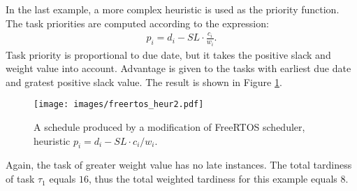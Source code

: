 In the last example, a more complex heuristic is used as the priority function.
The task priorities are computed according to the expression:
\begin{align*}
p_i = d_i - SL \cdot \frac{c_i}{w_i}.
\end{align*}
Task priority is proportional to due date, but it takes the positive slack and weight value into account.
Advantage is given to the tasks with earliest due date and gratest positive slack value.
The result is shown in Figure \ref{freertos_2}.
\begin{figure}[ht]
    \centering
    \texttt{[image: images/freertos\_heur2.pdf]}
    \caption{A schedule produced by a modification of FreeRTOS scheduler, heuristic $p_i = d_i - SL \cdot c_i / w_i$.}
    \label{freertos_2}
\end{figure}
Again, the task of greater weight value has no late instances.
The total tardiness of task $\tau_1$ equals $16$, thus the total weighted tardiness for this example equals $8$.